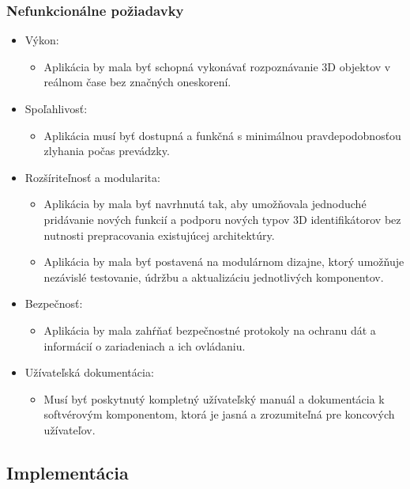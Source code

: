 \subsubsection{Nefunkcionálne požiadavky}

\begin{itemize}
    \item Výkon:
    \begin{itemize}
        \item Aplikácia by mala byť schopná vykonávať rozpoznávanie 3D objektov v reálnom čase bez značných oneskorení.
    \end{itemize}
    \item Spoľahlivosť:
    \begin{itemize}
        \item Aplikácia musí byť dostupná a funkčná s minimálnou pravdepodobnosťou zlyhania počas prevádzky.
    \end{itemize}
    \item Rozšíriteľnosť a modularita:
    \begin{itemize}
        \item Aplikácia by mala byť navrhnutá tak, aby umožňovala jednoduché pridávanie nových funkcií a podporu nových typov 3D identifikátorov bez nutnosti prepracovania existujúcej architektúry.
        \item Aplikácia by mala byť postavená na modulárnom dizajne, ktorý umožňuje nezávislé testovanie, údržbu a aktualizáciu jednotlivých komponentov.
    \end{itemize}
    \item Bezpečnosť:
    \begin{itemize}
        \item Aplikácia by mala zahŕňať bezpečnostné protokoly na ochranu dát a informácií o zariadeniach a ich ovládaniu.
    \end{itemize}
    \item Užívateľská dokumentácia:
    \begin{itemize}
        \item Musí byť poskytnutý kompletný užívateľský manuál a dokumentácia k softvérovým komponentom, ktorá je jasná a zrozumiteľná pre koncových užívateľov.
    \end{itemize}
\end{itemize}

\subsection{Implementácia}

